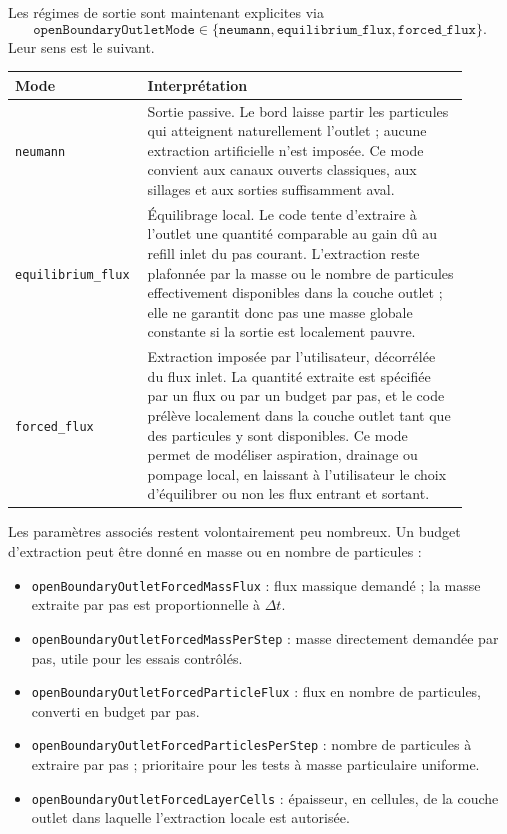 \documentclass[11pt,a4paper]{article}
\begin{document}
Les régimes de sortie sont maintenant explicites via
\begin{equation}
  \texttt{openBoundaryOutletMode}
  \in
  \{\texttt{neumann},\texttt{equilibrium\_flux},\texttt{forced\_flux}\}.
\end{equation}
Leur sens est le suivant.
\begin{center}
\begin{tabular}{p{0.22\linewidth}p{0.68\linewidth}}
\toprule
Mode & Interprétation \\
\midrule
\texttt{neumann} & Sortie passive. Le bord laisse partir les particules qui atteignent naturellement l'outlet ; aucune extraction artificielle n'est imposée. Ce mode convient aux canaux ouverts classiques, aux sillages et aux sorties suffisamment aval. \\
\texttt{equilibrium\_flux} & Équilibrage local. Le code tente d'extraire à l'outlet une quantité comparable au gain dû au refill inlet du pas courant. L'extraction reste plafonnée par la masse ou le nombre de particules effectivement disponibles dans la couche outlet ; elle ne garantit donc pas une masse globale constante si la sortie est localement pauvre. \\
\texttt{forced\_flux} & Extraction imposée par l'utilisateur, décorrélée du flux inlet. La quantité extraite est spécifiée par un flux ou par un budget par pas, et le code prélève localement dans la couche outlet tant que des particules y sont disponibles. Ce mode permet de modéliser aspiration, drainage ou pompage local, en laissant à l'utilisateur le choix d'équilibrer ou non les flux entrant et sortant. \\
\bottomrule
\end{tabular}
\end{center}

Les paramètres associés restent volontairement peu nombreux. Un budget d'extraction peut être donné en masse ou en nombre de particules :
\begin{itemize}[nosep]
  \item \texttt{openBoundaryOutletForcedMassFlux} : flux massique demandé ; la masse extraite par pas est proportionnelle à $\Delta t$.
  \item \texttt{openBoundaryOutletForcedMassPerStep} : masse directement demandée par pas, utile pour les essais contrôlés.
  \item \texttt{openBoundaryOutletForcedParticleFlux} : flux en nombre de particules, converti en budget par pas.
  \item \texttt{openBoundaryOutletForcedParticlesPerStep} : nombre de particules à extraire par pas ; prioritaire pour les tests à masse particulaire uniforme.
  \item \texttt{openBoundaryOutletForcedLayerCells} : épaisseur, en cellules, de la couche outlet dans laquelle l'extraction locale est autorisée.
\end{itemize}
\end{document}
